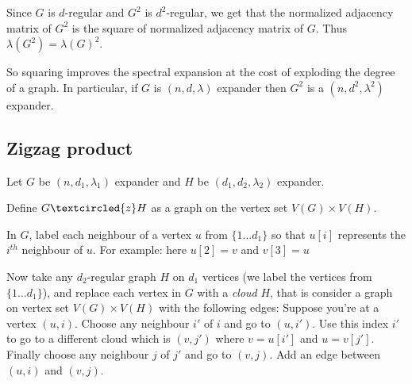 \documentclass[10pt]{article}
\theoremstyle{plain}
\theoremstyle{definition}
\begin{document}
Since $G$ is $d$-regular and $G^2$ is $d^2$-regular, we get that the normalized adjacency matrix of $G^2$ is the square of normalized adjacency matrix of $G$. Thus $\lambda(G^2) = \lambda(G)^2$.

So squaring improves the spectral expansion at the cost of exploding the degree of a graph. In particular, if $G$ is $(n,d,\lambda)$ expander then $G^2$ is a $(n,d^2,\lambda^2)$ expander.

\subsection{Zigzag product}

Let $G$ be $(n,d_1,\lambda_1)$ expander and $H$ be $(d_1, d_2, \lambda_2)$ expander.

Define $G \textcircled{z} H$ as a graph on the vertex set $V(G) \times V(H)$.

In $G$, label each neighbour of a vertex $u$ from $\{1 \ldots d_1\}$ so that $u[i]$ represents the $i^{th}$ neighbour of $u$. For example: here $u[2] = v$ and $v[3] = u$

\begin{center}
\end{center}

Now take any $d_2$-regular graph $H$ on $d_1$ vertices (we label the vertices from $\{1 \ldots d_1\}$), and replace each vertex in $G$ with a \textsl{cloud} $H$, that is consider a graph on vertex set $V(G) \times V(H)$ with the following edges: Suppose you're at a vertex $(u,i)$. Choose any neighbour $i'$ of $i$ and go to $(u,i')$. Use this index $i'$ to go to a different cloud which is $(v, j')$ where $v = u[i']$ and $u = v[j']$. Finally choose any neighbour $j$ of $j'$ and go to $(v,j)$. Add an edge between $(u,i)$ and $(v,j)$.
\end{document}
